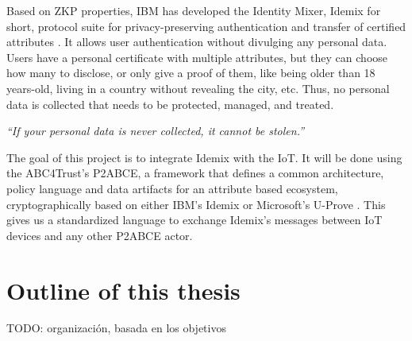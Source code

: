 Based on ZKP properties, IBM has developed the Identity Mixer, Idemix for short, protocol suite for privacy-preserving authentication and transfer of certified attributes \citep{idemixurl}. It allows user authentication without divulging any personal data. Users have a personal certificate with multiple attributes, but they can choose how many to disclose, or only give a proof of them, like being older than 18 years-old, living in a country without revealing the city, etc. Thus, no personal data is collected that needs to be protected, managed, and treated.

\begin{center}
	\textit{``If your personal data is never collected, it cannot be stolen.''}
\end{center}

The goal of this project is to integrate Idemix with the IoT. It will be done using the ABC4Trust's \ac{P2ABCE}, a framework that defines a common architecture, policy language and data artifacts for an attribute based ecosystem, cryptographically based on either IBM's Idemix or Microsoft's U-Prove \citep{p2abcurl}. This gives us a standardized language to exchange Idemix's messages between IoT devices and any other P2ABCE actor.

\hfil


\section{Outline of this thesis}

TODO: organización, basada en los objetivos

